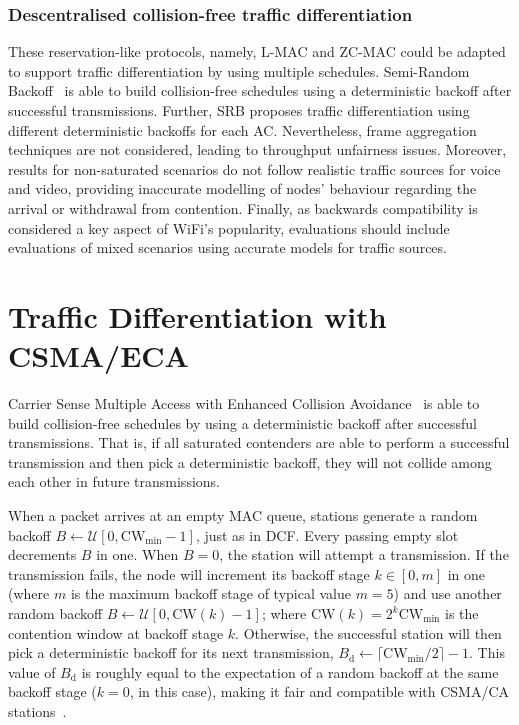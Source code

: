 \documentclass[a4paper]{article}
\begin{document}
\subsubsection{Descentralised collision-free traffic differentiation}
These reservation-like protocols, namely, L-MAC and ZC-MAC could be adapted to support traffic differentiation by using multiple schedules. Semi-Random Backoff~\cite{HE} is able to build collision-free schedules using a deterministic backoff after successful transmissions. Further, SRB proposes traffic differentiation using different deterministic backoffs for each AC. Nevertheless, frame aggregation techniques are not considered, leading to throughput unfairness issues. Moreover, results for non-saturated scenarios do not follow realistic traffic sources for voice and video, providing inaccurate modelling of nodes' behaviour regarding the arrival or withdrawal from contention. Finally, as backwards compatibility is considered a key aspect of WiFi's popularity, evaluations should include evaluations of mixed scenarios using accurate models for traffic sources.

\section{Traffic Differentiation with CSMA/ECA}\label{section3}
Carrier Sense Multiple Access with Enhanced Collision Avoidance~\cite{sanabria2014high, research2standards} is able to build collision-free schedules by using a deterministic backoff after successful transmissions. That is, if all saturated contenders are able to perform a successful transmission and then pick a deterministic backoff, they will not collide among each other in future transmissions.
	
When a packet arrives at an empty MAC queue, stations generate a random backoff $B\leftarrow\mathcal{U}[0,\text{CW}_{\min}-1]$, just as in DCF. Every passing empty slot decrements $B$ in one. When $B=0$, the station will attempt a transmission. If the transmission fails, the node will increment its backoff stage $k\in[0,m]$ in one (where $m$ is the maximum backoff stage of typical value $m=5$) and use another random backoff $B\leftarrow\mathcal{U}[0,\text{CW}(k)-1]$; where $\text{CW}(k)=2^{k}\text{CW}_{\min}$ is the contention window at backoff stage $k$. Otherwise, the successful station will then pick a deterministic backoff for its next transmission, $B_{\text{d}}\leftarrow \lceil \text{CW}_{\min}/2\rceil-1$. This value of $B_{\text{d}}$ is roughly equal to the expectation of a random backoff at the same backoff stage ($k=0$, in this case), making it fair and compatible with CSMA/CA stations~\cite{research2standards}.
\end{document}

